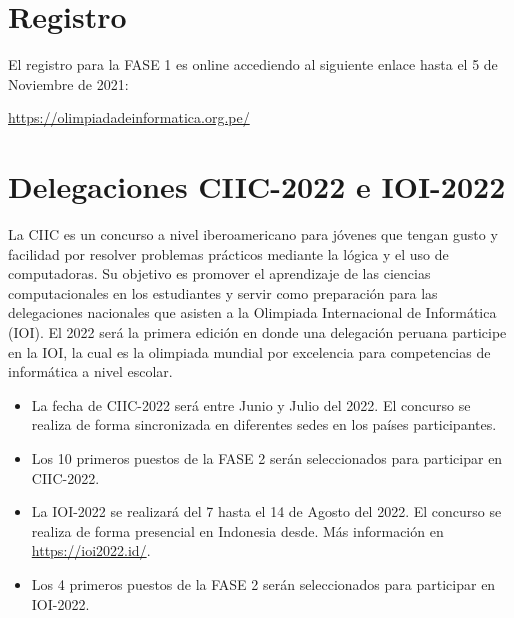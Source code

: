 \documentclass{article}
\begin{document}
\section{Registro}

El registro para la FASE 1 es online accediendo al siguiente enlace
{\color{red} hasta el 5 de Noviembre de 2021}:

\begin{center}
\url{https://olimpiadadeinformatica.org.pe/}
\end{center}

\section{Delegaciones CIIC-2022 e IOI-2022}

La CIIC es un concurso a nivel iberoamericano para jóvenes que tengan gusto y facilidad por resolver problemas prácticos mediante la lógica y el uso de computadoras. Su objetivo es promover el aprendizaje de las ciencias computacionales en los estudiantes y servir como preparación para las delegaciones nacionales que asisten a la Olimpiada Internacional de Informática (IOI).
El 2022 será la primera edición en donde una delegación peruana participe en la IOI, la cual es la olimpiada mundial por excelencia para competencias de informática a nivel escolar.

\begin{itemize}
\item 
La fecha de CIIC-2022 será entre Junio y Julio del 2022.
El concurso se realiza de forma sincronizada en diferentes sedes en los países participantes.

\item Los 10 primeros puestos de la FASE 2 serán seleccionados para participar en CIIC-2022.


\item 
La IOI-2022 se realizará del 7 hasta el 14 de Agosto del 2022.
El concurso se realiza de forma presencial en  Indonesia desde. Más información en
\url{https://ioi2022.id/}.

\item Los 4 primeros puestos de la FASE 2 serán seleccionados para participar en IOI-2022.





\end{itemize}
\end{document}
